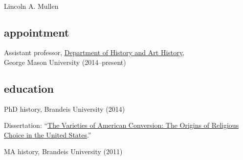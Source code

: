 \documentclass[11pt]{article}
\begin{document}
\thispagestyle{fancy}
\fancyfoot{}
\fancyhead{}
\renewcommand{\headrulewidth}{0pt}

\hfill\hfill\hfill
\hfill\hfill\hfill
\hfill\hfill\hfill
\hfill\hfill\hfill
\begin{minipage}[t]{1.4in}
   \\
\end{minipage}
\hfill
\begin{minipage}[t]{1.9in}
\end{minipage}

\vspace{0.1in}

{\Large Lincoln A. Mullen}\\[-0.1in]

\subsection{appointment}\label{appointment}

Assistant professor, \href{http://historyarthistory.gmu.edu/}{Department
  of History and Art History},\\George Mason University (2014--present)

\subsection{education}\label{education}

PhD history, Brandeis University (2014)

\hfill\begin{minipage}{6.25in}

  Dissertation: ``\href{/research/\#dissertation}{The Varieties of American 
    Conversion: The Origins of Religious Choice in the United States}.'' 

\end{minipage}

MA history, Brandeis University (2011)
\end{document}

